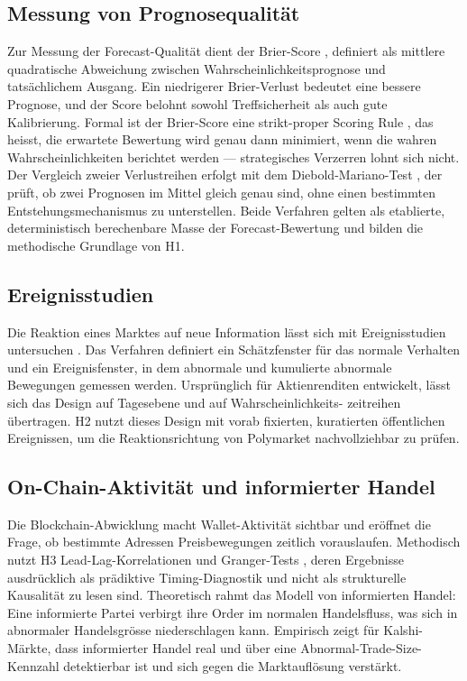 \subsection{Messung von Prognosequalität}
Zur Messung der Forecast-Qualität dient der Brier-Score \citep{lit_brier_001},
definiert als mittlere quadratische Abweichung zwischen Wahrscheinlichkeitsprognose
und tatsächlichem Ausgang. Ein niedrigerer Brier-Verlust bedeutet eine bessere
Prognose, und der Score belohnt sowohl Treffsicherheit als auch gute Kalibrierung.
Formal ist der Brier-Score eine strikt-proper Scoring Rule \citep{lit_gneiting_2007},
das heisst, die erwartete Bewertung wird genau dann minimiert, wenn die wahren
Wahrscheinlichkeiten berichtet werden --- strategisches Verzerren lohnt sich nicht.
Der Vergleich zweier Verlustreihen erfolgt mit dem Diebold-Mariano-Test
\citep{lit_dm_001}, der prüft, ob zwei Prognosen im Mittel gleich genau sind, ohne
einen bestimmten Entstehungsmechanismus zu unterstellen. Beide Verfahren gelten
als etablierte, deterministisch berechenbare Masse der Forecast-Bewertung und
bilden die methodische Grundlage von H1.

\subsection{Ereignisstudien}
Die Reaktion eines Marktes auf neue Information lässt sich mit Ereignisstudien
untersuchen \citep{lit_eventstudy_001}. Das Verfahren definiert ein Schätzfenster
für das normale Verhalten und ein Ereignisfenster, in dem abnormale und
kumulierte abnormale Bewegungen gemessen werden. Ursprünglich für Aktienrenditen
entwickelt, lässt sich das Design auf Tagesebene und auf Wahrscheinlichkeits-
zeitreihen übertragen. H2 nutzt dieses Design mit vorab fixierten, kuratierten
öffentlichen Ereignissen, um die Reaktionsrichtung von Polymarket nachvollziehbar
zu prüfen.

\subsection{On-Chain-Aktivität und informierter Handel}
Die Blockchain-Abwicklung macht Wallet-Aktivität sichtbar und eröffnet die Frage,
ob bestimmte Adressen Preisbewegungen zeitlich vorauslaufen. Methodisch nutzt H3
Lead-Lag-Korrelationen und Granger-Tests \citep{lit_granger_001}, deren Ergebnisse
ausdrücklich als prädiktive Timing-Diagnostik und nicht als strukturelle
Kausalität zu lesen sind. Theoretisch rahmt das Modell von \citet{lit_kyle_001}
informierten Handel: Eine informierte Partei verbirgt ihre Order im normalen
Handelsfluss, was sich in abnormaler Handelsgrösse niederschlagen kann. Empirisch
zeigt \citet{zotero_delvecchio_001} für Kalshi-Märkte, dass informierter Handel
real und über eine Abnormal-Trade-Size-Kennzahl detektierbar ist und sich gegen
die Marktauflösung verstärkt.


